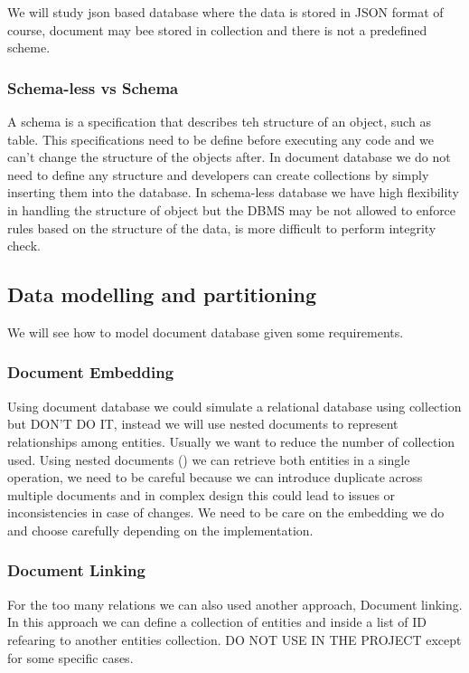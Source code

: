 We will study json based database where the data is stored in JSON format of course, document may bee stored in collection and there is not a predefined scheme.

\subsubsection{Schema-less vs Schema}
A schema is a specification that describes teh structure of an object, such as table. This specifications need to be define before executing any code and we can't change the structure of the objects after. In document database we do not need to define any structure and developers can create collections by simply inserting them into the database. In schema-less database we have high flexibility in handling the structure of object but the DBMS may be not allowed to enforce rules based on the structure of the data, is more difficult to perform integrity check.

\subsection{Data modelling and partitioning}
We will see how to model document database given some requirements. 

\subsubsection{Document Embedding}
Using document database we could simulate a relational database using collection but DON'T DO IT, instead we will use nested documents to represent relationships among entities. Usually we want to reduce the number of collection used. Using nested documents () we can retrieve both entities in a single operation, we need to be careful because we can introduce duplicate across multiple documents and in complex design this could lead to issues or inconsistencies in case of changes. We need to be care on the embedding we do and choose carefully depending on the implementation.

\subsubsection{Document Linking}
For the too many relations we can also used another approach, Document linking. In this approach we can define a collection of entities and inside a list of ID refearing to another entities collection. DO NOT USE IN THE PROJECT except for some specific cases.